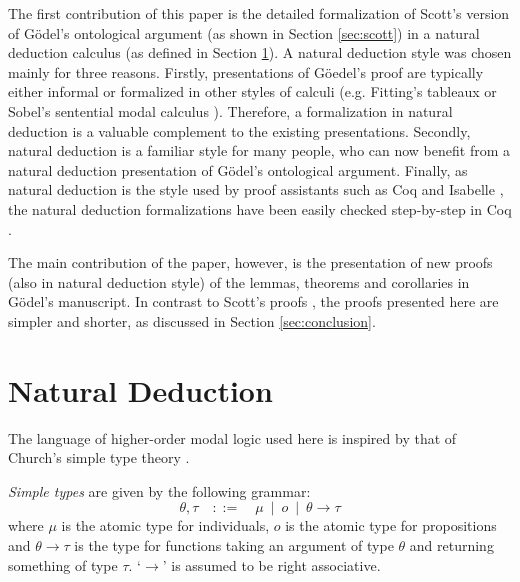 \documentclass{llncs}
\newcommand{\imp}{\rightarrow}
\begin{document}
The first contribution of this paper is the detailed formalization of Scott's version \cite{Scott} of G\"odel's ontological argument \cite{Goedel} (as shown in Section \ref{sec:scott}) in a natural deduction calculus (as defined in Section \ref{sec:calculus}). A natural deduction style \citep{gentzen,prawitz} was chosen mainly for three reasons. Firstly, presentations of G\"oedel's proof are typically either informal or formalized in other styles of calculi (e.g. Fitting's tableaux \cite{fitting} or Sobel's sentential modal calculus \cite{sobel2}). Therefore, a formalization in natural deduction is a valuable complement to the existing presentations. Secondly, natural deduction is a familiar style for many people, who can now benefit from a natural deduction presentation of G\"odel's ontological argument. Finally, as natural deduction is the style used by proof assistants such as Coq \cite{coq} and Isabelle \cite{isabelle}, the natural deduction formalizations have been easily checked step-by-step in Coq \cite{coqformalizations}.

The main contribution of the paper, however, is the presentation of new proofs (also in natural deduction style) of the lemmas, theorems and corollaries in G\"odel's manuscript. In contrast to Scott's proofs \cite{Scott}, the proofs presented here are simpler and shorter, as discussed in Section \ref{sec:conclusion}.



\section{Natural Deduction}
\label{sec:calculus}

The language of higher-order modal logic used here is inspired by that of Church's simple type theory \citep{church}.

\begin{definition} \emph{Simple types} are given by the following grammar:
$$
  \theta,\tau \quad ::= \quad \mu \ \mid \ o \ \mid \ \theta \imp \tau
$$
where $\mu$ is the atomic type for individuals, $o$ is the atomic type for propositions and $\theta \imp \tau$ is the type for functions taking an argument of type $\theta$ and returning something of type $\tau$. `$\imp$' is assumed to be right associative.
\end{definition}
\end{document}
